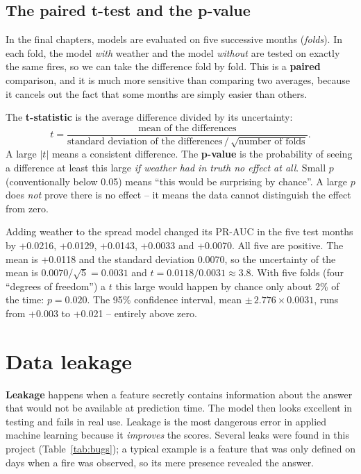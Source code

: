 \documentclass[11pt,a4paper,oneside]{report}
\begin{document}
\subsection{The paired t-test and the p-value}

In the final chapters, models are evaluated on five successive months
(\emph{folds}). In each fold, the model \emph{with} weather and the model
\emph{without} are tested on exactly the same fires, so we can take the
difference fold by fold. This is a \textbf{paired} comparison, and it is much
more sensitive than comparing two averages, because it cancels out the fact that
some months are simply easier than others.

The \textbf{t-statistic} is the average difference divided by its uncertainty:
\[
t = \frac{\text{mean of the differences}}{\text{standard deviation of the differences}\,/\,\sqrt{\text{number of folds}}}.
\]
A large $|t|$ means a consistent difference. The \textbf{p-value} is the
probability of seeing a difference at least this large \emph{if weather had in
truth no effect at all}. Small $p$ (conventionally below 0.05) means \enquote{this
would be surprising by chance}. A large $p$ does \emph{not} prove there is no
effect -- it means the data cannot distinguish the effect from zero.

\begin{plainbox}
Adding weather to the spread model changed its PR-AUC in the five test months
by +0.0216, +0.0129, +0.0143, +0.0033 and +0.0070. All five are positive. The
mean is +0.0118 and the standard deviation 0.0070, so the uncertainty of the mean
is $0.0070/\sqrt{5} = 0.0031$ and $t = 0.0118/0.0031 \approx 3.8$. With five
folds (four \enquote{degrees of freedom}) a $t$ this large would happen by chance
only about 2\% of the time: $p = 0.020$. The 95\% confidence interval, mean
$\pm\,2.776\times0.0031$, runs from +0.003 to +0.021 -- entirely above zero.
\end{plainbox}

\section{Data leakage}

\textbf{Leakage} happens when a feature secretly contains information about the
answer that would not be available at prediction time. The model then looks
excellent in testing and fails in real use. Leakage is the most dangerous error
in applied machine learning because it \emph{improves} the scores. Several
leaks were found in this project (Table~\ref{tab:bugs}); a typical example is a
feature that was only defined on days when a fire was observed, so its mere
presence revealed the answer.
\end{document}
